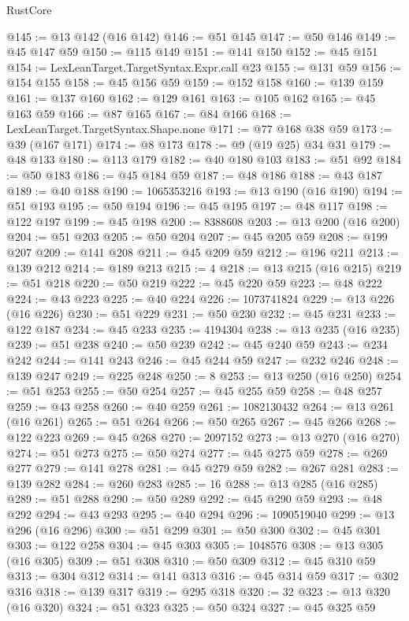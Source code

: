 \begin{lexlean}{RustCore}
\begin{coremodule}
@145 := @13 @142 (@16 @142)
@146 := @51 @145
@147 := @50 @146
@149 := @45 @147 @59
@150 := @115 @149
@151 := @141 @150
@152 := @45 @151
@154 := LexLeanTarget.TargetSyntax.Expr.call @23
@155 := @131 @59
@156 := @154 @155
@158 := @45 @156 @59
@159 := @152 @158
@160 := @139 @159
@161 := @137 @160
@162 := @129 @161
@163 := @105 @162
@165 := @45 @163 @59
@166 := @87 @165
@167 := @84 @166
@168 := LexLeanTarget.TargetSyntax.Shape.none
@171 := @77 @168 @38 @59
@173 := @39 (@167 @171)
@174 := @8 @173
@178 := @9 (@19 @25) @34 @31
@179 := @48 @133
@180 := @113 @179
@182 := @40 @180 @103
@183 := @51 @92
@184 := @50 @183
@186 := @45 @184 @59
@187 := @48 @186
@188 := @43 @187
@189 := @40 @188
@190 := 1065353216
@193 := @13 @190 (@16 @190)
@194 := @51 @193
@195 := @50 @194
@196 := @45 @195
@197 := @48 @117
@198 := @122 @197
@199 := @45 @198
@200 := 8388608
@203 := @13 @200 (@16 @200)
@204 := @51 @203
@205 := @50 @204
@207 := @45 @205 @59
@208 := @199 @207
@209 := @141 @208
@211 := @45 @209 @59
@212 := @196 @211
@213 := @139 @212
@214 := @189 @213
@215 := 4
@218 := @13 @215 (@16 @215)
@219 := @51 @218
@220 := @50 @219
@222 := @45 @220 @59
@223 := @48 @222
@224 := @43 @223
@225 := @40 @224
@226 := 1073741824
@229 := @13 @226 (@16 @226)
@230 := @51 @229
@231 := @50 @230
@232 := @45 @231
@233 := @122 @187
@234 := @45 @233
@235 := 4194304
@238 := @13 @235 (@16 @235)
@239 := @51 @238
@240 := @50 @239
@242 := @45 @240 @59
@243 := @234 @242
@244 := @141 @243
@246 := @45 @244 @59
@247 := @232 @246
@248 := @139 @247
@249 := @225 @248
@250 := 8
@253 := @13 @250 (@16 @250)
@254 := @51 @253
@255 := @50 @254
@257 := @45 @255 @59
@258 := @48 @257
@259 := @43 @258
@260 := @40 @259
@261 := 1082130432
@264 := @13 @261 (@16 @261)
@265 := @51 @264
@266 := @50 @265
@267 := @45 @266
@268 := @122 @223
@269 := @45 @268
@270 := 2097152
@273 := @13 @270 (@16 @270)
@274 := @51 @273
@275 := @50 @274
@277 := @45 @275 @59
@278 := @269 @277
@279 := @141 @278
@281 := @45 @279 @59
@282 := @267 @281
@283 := @139 @282
@284 := @260 @283
@285 := 16
@288 := @13 @285 (@16 @285)
@289 := @51 @288
@290 := @50 @289
@292 := @45 @290 @59
@293 := @48 @292
@294 := @43 @293
@295 := @40 @294
@296 := 1090519040
@299 := @13 @296 (@16 @296)
@300 := @51 @299
@301 := @50 @300
@302 := @45 @301
@303 := @122 @258
@304 := @45 @303
@305 := 1048576
@308 := @13 @305 (@16 @305)
@309 := @51 @308
@310 := @50 @309
@312 := @45 @310 @59
@313 := @304 @312
@314 := @141 @313
@316 := @45 @314 @59
@317 := @302 @316
@318 := @139 @317
@319 := @295 @318
@320 := 32
@323 := @13 @320 (@16 @320)
@324 := @51 @323
@325 := @50 @324
@327 := @45 @325 @59

\end{coremodule}
\end{lexlean}
